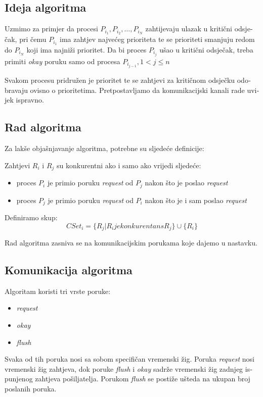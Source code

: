 \documentclass[12pt]{rectors}
\begin{document}
\begin{otherlanguage}{croatian}
\subsection{Ideja algoritma}
Uzmimo za primjer da procesi $P_{i_1}, P_{i_2}, \dots, P_{i_N}$ zahtijevaju ulazak u kritični odsječak, pri čemu $P_{i_1}$ ima zahtjev najvećeg prioriteta te se prioriteti smanjuju redom do $P_{i_N}$ koji ima najniži prioritet. Da bi proces $P_{i_j}$ ušao u kritični odsječak, treba primiti \textit{okay} poruku samo od procesa $P_{i_{j-1}}, 1 < j \leq n$

Svakom procesu pridružen je prioritet te se zahtjevi za kritičnom odsječku odobravaju ovisno o prioritetima. Pretpostavljamo da komunikacijski kanali rade uvijek ispravno.

\subsection{Rad algoritma}
Za lakše objašnjavanje algoritma, potrebne su sljedeće definicije:
\begin{defn}	Zahtjevi $R_i$ i $R_j$ su konkurentni ako i samo ako vrijedi sljedeće:
	\begin{itemize}
		\item proces $P_i$ je  primio poruku \textit{request} od $P_j$ nakon što je poslao \textit{request}
		\item proces $P_j$ je primio poruku \textit{request} od $P_i$ nakon što je i sam poslao \textit{request}
	\end{itemize}
\end{defn}


\begin{defn} Definiramo skup:
	\[
	CSet_i = \{ R_j | R_i je konkurentan s R_j \} \cup \{ R_i \}
	\]
\end{defn}

Rad algoritma zasniva se na komunikacijskim porukama koje dajemo u nastavku.

\subsection{Komunikacija algoritma}
Algoritam koristi tri vrste poruke:

\begin{itemize}
	\item \textit{request}
	\item \textit{okay}
	\item \textit{flush}
\end{itemize}
Svaka od tih poruka nosi sa sobom specifičan vremenski žig. Poruka \textit{request} nosi vremenski žig zahtjeva, dok poruke \textit{flush} i \textit{okay} sadrže vremenski žig zadnjeg ispunjenog zahtjeva pošiljatelja. Porukom \textit{flush}  se postiže ušteda na ukupan broj poslanih poruka.


\end{otherlanguage}
\end{document}
